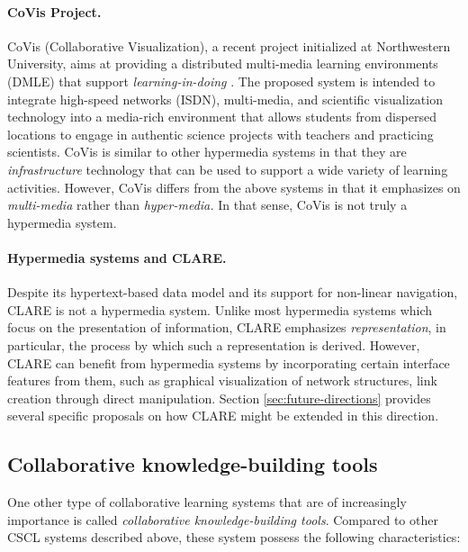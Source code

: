 \paragraph{CoVis Project.}

CoVis (Collaborative Visualization), a recent project initialized at
Northwestern University, aims at providing a distributed multi-media
learning environments (DMLE) that support {\it learning-in-doing\/}
\cite{Pea93}. The proposed system is intended to integrate high-speed
networks (ISDN), multi-media, and scientific visualization technology into
a media-rich environment that allows students from dispersed locations to
engage in authentic science projects with teachers and practicing
scientists. CoVis is similar to other hypermedia systems in that they are
{\it infrastructure\/} technology that can be used to support a wide
variety of learning activities. However, CoVis differs from the above
systems in that it emphasizes on {\it multi-media\/} rather than {\it
hyper-media.\/} In that sense, CoVis is not truly a hypermedia system.


\paragraph{Hypermedia systems and CLARE.}

Despite its hypertext-based data model and its support for non-linear
navigation, CLARE is not a hypermedia system. Unlike most hypermedia
systems which focus on the presentation of information, CLARE emphasizes
{\it representation\/}, in particular, the process by which such a
representation is derived. However, CLARE can benefit from hypermedia
systems by incorporating certain interface features from them, such as
graphical visualization of network structures, link creation through direct
manipulation. Section \ref{sec:future-directions} provides several specific
proposals on how CLARE might be extended in this direction.


\subsection{Collaborative knowledge-building tools}
\label{kb-tools}

One other type of collaborative learning systems that are of increasingly
importance is called {\it collaborative knowledge-building tools\/}.
Compared to other CSCL systems described above, these system possess the
following characteristics:


